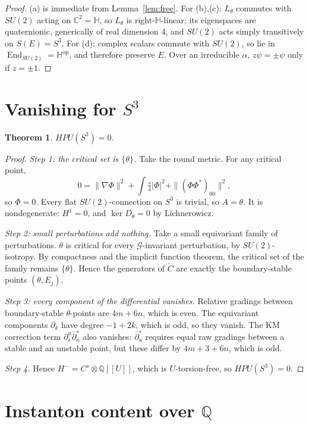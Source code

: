 \documentclass[11pt]{amsart}
\newtheorem{theorem}{Theorem}
\theoremstyle{definition}
\theoremstyle{remark}
\newcommand{\Q}{\mathbb{Q}}
\newcommand{\C}{\mathbb{C}}
\newcommand{\HH}{\mathbb{H}}
\newcommand{\cG}{\mathcal{G}}
\newcommand{\HPU}{\mathit{HPU}}
\DeclareMathOperator{\End}{End}
\begin{document}
\begin{proof}
(a) is immediate from Lemma~\ref{lem:free}. For (b),(c): $L_\theta$
commutes with $SU(2)$ acting on $\C^2=\HH$, so $L_\theta$ is
right-$\HH$-linear; its eigenspaces are quaternionic, generically of real
dimension $4$, and $SU(2)$ acts simply transitively on $S(E)=S^3$. For
(d): complex scalars commute with $SU(2)$, so lie in
$\End_{SU(2)}=\HH^{\mathrm{op}}$, and therefore preserve $E$. Over an
irreducible $\alpha$, $z\psi=\pm\psi$ only if $z=\pm1$.
\end{proof}

\section{Vanishing for $S^3$}

\begin{theorem}\label{thm:A}
$\HPU(S^3)=0$.
\end{theorem}

\begin{proof}
\emph{Step 1: the critical set is $\{\theta\}$.} Take the round metric.
For any critical point,
\[
0=\|\nabla\Phi\|^2+\int\tfrac{s}{4}|\Phi|^2+\|(\Phi\Phi^*)_{00}\|^2,
\]
so $\Phi=0$. Every flat $SU(2)$-connection on $S^3$ is trivial, so
$A=\theta$. It is nondegenerate: $H^1=0$, and $\ker D_\theta=0$ by
Lichnerowicz.

\emph{Step 2: small perturbations add nothing.} Take a small equivariant
family of perturbations. $\theta$ is critical for every $\cG$-invariant
perturbation, by $SU(2)$-isotropy. By compactness and the implicit
function theorem, the critical set of the family remains $\{\theta\}$.
Hence the generators of $\check C$ are exactly the boundary-stable points
$(\theta,E_j)$.

\emph{Step 3: every component of the differential vanishes.} Relative
gradings between boundary-stable $\theta$-points are $4m+6n$, which is
even. The equivariant components $\partial_k$ have degree $-1+2k$, which
is odd, so they vanish. The KM correction term
$\partial^u_s\bar\partial^s_u$ also vanishes: $\bar\partial^s_u$ requires
equal raw gradings between a stable and an unstable point, but these
differ by $4m+3+6n$, which is odd.

\emph{Step 4.} Hence $H^-=C^s\otimes\Q[[U]]$, which is $U$-torsion-free,
so $\HPU(S^3)=0$.
\end{proof}

\section{Instanton content over $\Q$}
\end{document}
